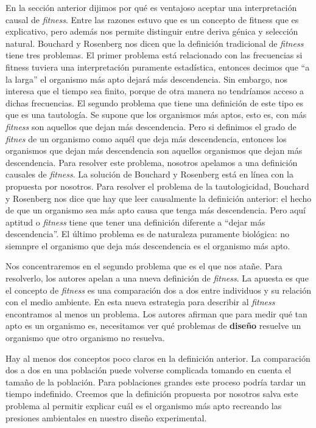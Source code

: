 En la sección anterior dijimos por qué es ventajoso aceptar una interpretación causal de \emph{fitness}. Entre las razones estuvo que es un concepto de fitness que es explicativo, pero además nos permite distinguir entre deriva génica y selección natural. Bouchard y Rosenberg \cite{Bouchard2004} nos dicen que la definición tradicional de \emph{fitness} tiene tres problemas. El primer problema está relacionado con las frecuencias si fitness tuviera una interpretación puramente estadística, entonces decimos que ``a la larga'' el organismo más apto dejará más descendencia. Sin embargo, nos interesa que el tiempo sea finito, porque de otra manera no tendríamos acceso a dichas frecuencias. El segundo problema que tiene una definición de este tipo es que es una tautología. Se supone que los organismos más aptos, esto es, con más \emph{fitness} son aquellos que dejan más descendencia. Pero si definimos el grado de \emph{fitnes} de un organismo como aquél que deja más descendencia, entonces los organismos que dejan más descendencia son aquellos organismos que dejan más descendencia. Para resolver este problema, nosotros apelamos a una definición causales de \emph{fitness}. La solución de Bouchard y Rosenberg está en línea con la propuesta por nosotros. Para resolver el problema de la tautologicidad, Bouchard y Rosenberg nos dice que hay que leer causalmente la definición anterior: el hecho de que un organismo sea más apto causa que tenga más descendencia. Pero aquí aptitud o \emph{fitness} tiene que tener una definición diferente a ``dejar más descendencia''. El último problema es de naturaleza puramente biológica: no siemnpre el organismo que deja más descendencia es el organismo más apto.

Nos concentraremos en el segundo problema que es el que nos atañe. Para resolverlo, los autores apelan a una nueva definición de \emph{fitness}. La apuesta es que el concepto de \emph{fitness} es una comparación dos a dos entre individuos y su relación con el medio ambiente. En esta nueva estrategia para describir al \emph{fitness} encontramos al menos un problema. Los autores afirman que para medir qué tan apto es un organismo es, necesitamos ver qué problemas de \textbf{diseño} resuelve un organismo que otro organismo no resuelva.

Hay al menos dos conceptos poco claros en la definición anterior. La comparación dos a dos en una población puede volverse complicada tomando en cuenta el tamaño de la población. Para poblaciones grandes este proceso podría tardar un tiempo indefinido. Creemos que la definición propuesta por nosotros salva este problema al permitir explicar cuál es el organismo más apto recreando las presiones ambientales en nuestro diseño experimental.

